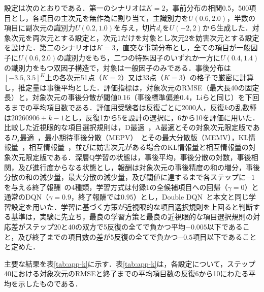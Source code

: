 \documentclass[paper]{ieicej}
\begin{document}
設定は次のとおりである．第一のシナリオは$K=2$，事前分布の相関0.5，500項目とし，各項目の主次元を無作為に割り当て，主識別力を$U(0.6,2.0)$，半数の項目に副次元の識別力$U(0.2,1.0)$を与え，切片$d_i$を$U(-2,2)$から生成した．対象次元を両次元とする設定と，次元1だけを対象とし次元2を妨害次元とする設定を設けた．第二のシナリオは$K=3$，直交な事前分布とし，全ての項目が一般因子に$U(0.6,2.0)$の識別力をもち，二つの特殊因子のいずれか一方に$U(0.4,1.4)$の識別力をもつ双因子構造で，対象は一般因子のみである．事後分布は$[-3.5,3.5]^K$上の各次元51点（$K=2$）又は33点（$K=3$）の格子で厳密に計算し，推定量は事後平均とした．評価指標は，対象次元のRMSE（最大長40の固定長）と，対象次元の事後分散が閾値0.16（事後標準偏差0.4，Liらと同じ）を下回るまでの平均項目数である．評価用受験者は反復ごとに2000人，反復$k$の乱数種は$20260906+k-1$とし，反復1から5を設計の選択に，6から10を評価に用いた．比較した近視眼的な項目選択規則は，D最適~\cite{Segall1996}，A最適とその対象次元限定版である$D_s$最適~\cite{MulderVanderLinden2009}，最小期待事後分散（MEPV）~\cite{vanderLinden1999}とその最大分散版（MEMV），KL情報量~\cite{VeldkampVanderLinden2002}，相互情報量~\cite{WangChang2011}，並びに妨害次元がある場合のKL情報量と相互情報量の対象次元限定版である．深層Q学習の状態は，事後平均，事後分散の対数，事後相関，及び進行度からなる状態とし，報酬は対象次元の事後精度の和の増分，事後分散の和の減少量，最大分散の減少量，及び閾値に達するまで各ステップに$-1$を与える終了報酬~\cite{LiGibbonsRockova2026}の4種類，学習方式は付録1の全候補項目への回帰（$\gamma=0$）と通常のDQN（$\gamma=0.9$，終了報酬では$0.95$）とし，Double DQN~\cite{vanHasselt2016}と本文と同じ学習設定を用いた．学習に基づく方策が近視眼的な項目選択規則を上回ると判断する基準は，実験に先立ち，最良の学習方策と最良の近視眼的な項目選択規則の対応差がステップ20と40の双方で5反復の全てで負かつ平均$-0.005$以下であること，及び終了までの項目数の差が5反復の全てで負かつ$-0.5$項目以下であることと定めた．

主要な結果を表\ref{tab:app-k}に示す．表\ref{tab:app-k}は，各設定について，ステップ40における対象次元のRMSEと終了までの平均項目数の反復6から10にわたる平均を示したものである．
\end{document}
